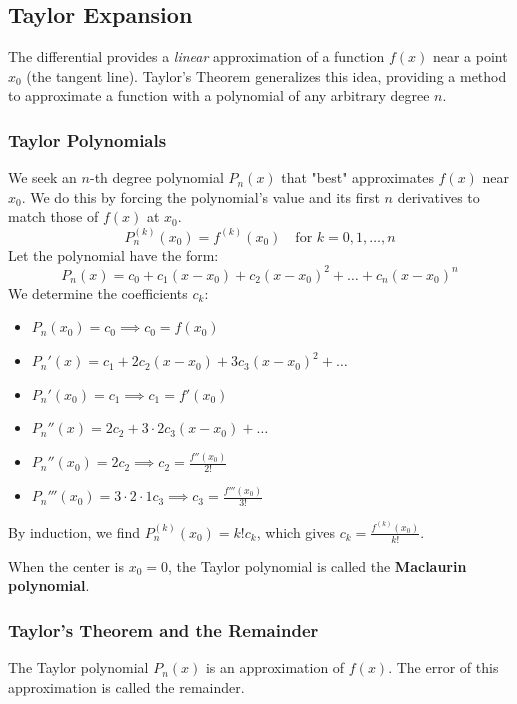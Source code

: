\documentclass[oneside]{book}
\begin{document}
\subsection{Taylor Expansion}

The differential provides a \textit{linear} approximation of a function $f(x)$ near a point $x_0$ (the tangent line). Taylor's Theorem generalizes this idea, providing a method to approximate a function with a polynomial of any arbitrary degree $n$.

\subsubsection{Taylor Polynomials}

We seek an $n$-th degree polynomial $P_n(x)$ that "best" approximates $f(x)$ near $x_0$. We do this by forcing the polynomial's value and its first $n$ derivatives to match those of $f(x)$ at $x_0$.
\[
P_n^{(k)}(x_0) = f^{(k)}(x_0) \quad \text{for } k=0, 1, \dots, n
\]
Let the polynomial have the form:
\[
P_n(x) = c_0 + c_1(x-x_0) + c_2(x-x_0)^2 + \dots + c_n(x-x_0)^n
\]
We determine the coefficients $c_k$:
\begin{itemize}
    \item $P_n(x_0) = c_0 \implies c_0 = f(x_0)$
    \item $P_n'(x) = c_1 + 2c_2(x-x_0) + 3c_3(x-x_0)^2 + \dots$
    \item $P_n'(x_0) = c_1 \implies c_1 = f'(x_0)$
    \item $P_n''(x) = 2c_2 + 3 \cdot 2 c_3(x-x_0) + \dots$
    \item $P_n''(x_0) = 2c_2 \implies c_2 = \frac{f''(x_0)}{2!}$
    \item $P_n'''(x_0) = 3 \cdot 2 \cdot 1 c_3 \implies c_3 = \frac{f'''(x_0)}{3!}$
\end{itemize}
By induction, we find $P_n^{(k)}(x_0) = k! c_k$, which gives $c_k = \frac{f^{(k)}(x_0)}{k!}$.

\begin{definition}
When the center is $x_0 = 0$, the Taylor polynomial is called the \textbf{Maclaurin polynomial}.
\end{definition}

\subsubsection{Taylor's Theorem and the Remainder}

The Taylor polynomial $P_n(x)$ is an approximation of $f(x)$. The error of this approximation is called the remainder.
\end{document}
